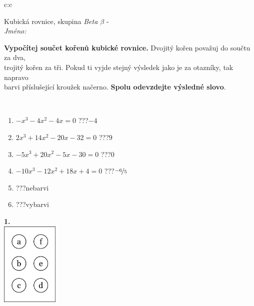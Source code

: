 \documentclass[10pt]{report}
\begin{document}
\begin{tabular}{c:c}
\begin{minipage}[c][104.5mm][t]{0.5\linewidth}
\begin{center}
\vspace{7mm}
{\huge Kubická rovnice, skupina \textit{Beta $\beta$} -}\\[5mm]
\textit{Jméno:}\phantom{xxxxxxxxxxxxxxxxxxxxxxxxxxxxxxxxxxxxxxxxxxxxxxxxxxxxxxxxxxxxxxxxx}\\[5mm]
\begin{minipage}{0.95\linewidth}
\begin{center}
\textbf{Vypočítej součet kořenů kubické rovnice.} Dvojitý kořen považuj do součtu za dva,\\trojitý kořen za tři. Pokud ti vyjde stejný výsledek jako je za otazníky, tak napravo\\barvi příslušející kroužek načerno. \textbf{Spolu odevzdejte výsledné slovo}.
\end{center}
\end{minipage}
\\[1mm]
\begin{minipage}{0.79\linewidth}
\begin{center}
\begin{varwidth}{\linewidth}
\begin{enumerate}
\Large
\item $-x^3-4x^2-4x=0$\quad \dotfill\; ???\;\dotfill \quad $-4$
\item $2x^3+14x^2-20x-32=0$\quad \dotfill\; ???\;\dotfill \quad $9$
\item $-5x^3+20x^2-5x-30=0$\quad \dotfill\; ???\;\dotfill \quad $0$
\item $-10x^3-12x^2+18x+4=0$\quad \dotfill\; ???\;\dotfill \quad $\nicefrac{-6}{5}$
\item \quad \dotfill\; ???\;\dotfill \quad nebarvi
\item \quad \dotfill\; ???\;\dotfill \quad vybarvi
\end{enumerate}
\end{varwidth}
\end{center}
\end{minipage}
\begin{minipage}{0.20\linewidth}
\begin{center}
{\Huge\bfseries 1.} \\[2mm]
\includegraphics[height=40mm]{../images/braille.png}

\end{center}
\end{minipage}
\end{center}
\end{minipage}
\end{tabular}
\end{document}
